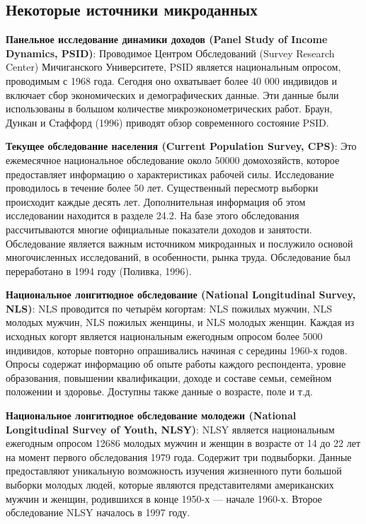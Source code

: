 \subsection{Некоторые источники микроданных}


{\bf Панельное исследование динамики доходов (Panel Study of Income Dynamics, PSID)}: Проводимое  Центром Обследований (Survey Research Center) Мичиганского Университете, PSID является национальным опросом, проводимым с 1968 года. Сегодня оно охватывает более 40 000 индивидов и включает сбор экономических и демографических данные. Эти данные были использованы в большом количестве микроэконометрических работ. Браун, Дункан и Стаффорд (1996) приводят обзор современного состояние PSID.


{\bf Текущее обследование населения (Current Population Survey, CPS)}: Это ежемесячное национальное обследование около 50000 домохозяйств, которое предоставляет информацию о характеристиках рабочей силы. Исследование проводилось в течение более 50 лет. Существенный пересмотр выборки происходит каждые десять лет. Дополнительная информация об этом исследовании находится в разделе 24.2. На базе этого обследования рассчитываются многие официальные показатели доходов и занятости. Обследование является важным источником микроданных и послужило основой многочисленных исследований, в особенности, рынка труда. Обследование был переработано в 1994 году (Поливка, 1996).


{\bf Национальное лонгитюдное обследование (National Longitudinal Survey, NLS)}: NLS проводится по четырём  когортам: NLS пожилых мужчин, NLS молодых мужчин, NLS пожилых женщины, и NLS молодых женщин. Каждая из исходных когорт является национальным ежегодным опросом более 5000 индивидов, которые повторно опрашивались начиная с середины 1960-х годов. Опросы содержат информацию об опыте работы каждого респондента, уровне образования, повышении квалификации, доходе и составе семьи, семейном положении и здоровье. Доступны также данные о возрасте, поле и т.д. 


{\bf Национальное лонгитюдное обследование молодежи (National Longitudinal Survey of Youth, NLSY)}: NLSY является национальным ежегодным опросом 12686 молодых мужчин и женщин в возрасте от 14 до 22 лет на момент первого обследования 1979 года. Содержит три подвыборки. Данные предоставляют уникальную возможность  изучения  жизненного пути большой выборки молодых людей, которые являются представителями американских мужчин и женщин, родившихся в конце 1950-х --- начале 1960-х. Второе обследование NLSY началось в 1997 году.



